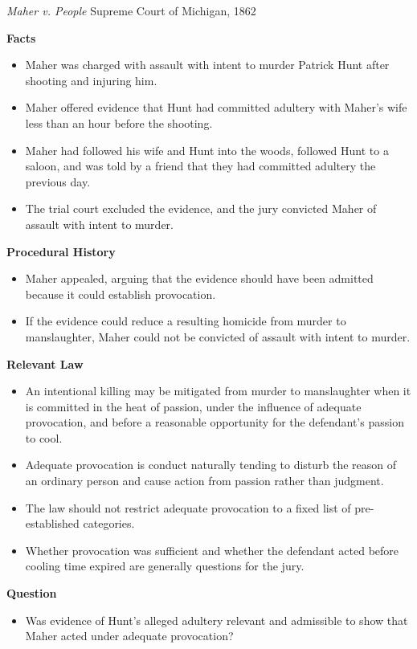 \documentclass[11pt]{tex/lawoutline}
\begin{document}
\casebox
    {\textit{Maher v. People}}
    {Supreme Court of Michigan, 1862}
    {
        \textbf{Facts}
        \begin{itemize}
            \item Maher was charged with assault with intent to murder Patrick Hunt after shooting and injuring him.
            \item Maher offered evidence that Hunt had committed adultery with Maher's wife less than an hour before the shooting.
            \item Maher had followed his wife and Hunt into the woods, followed Hunt to a saloon, and was told by a friend that they had committed adultery the previous day.
            \item The trial court excluded the evidence, and the jury convicted Maher of assault with intent to murder.
        \end{itemize}

        \textbf{Procedural History}
        \begin{itemize}
            \item Maher appealed, arguing that the evidence should have been admitted because it could establish provocation.
            \item If the evidence could reduce a resulting homicide from murder to manslaughter, Maher could not be convicted of assault with intent to murder.
        \end{itemize}

        \textbf{Relevant Law}
        \begin{itemize}
            \item An intentional killing may be mitigated from murder to manslaughter when it is committed in the heat of passion, under the influence of adequate provocation, and before a reasonable opportunity for the defendant's passion to cool.
            \item Adequate provocation is conduct naturally tending to disturb the reason of an ordinary person and cause action from passion rather than judgment.
            \item The law should not restrict adequate provocation to a fixed list of pre-established categories.
            \item Whether provocation was sufficient and whether the defendant acted before cooling time expired are generally questions for the jury.
        \end{itemize}

        \textbf{Question}
        \begin{itemize}
            \item Was evidence of Hunt's alleged adultery relevant and admissible to show that Maher acted under adequate provocation?
        \end{itemize}

}
\end{document}
